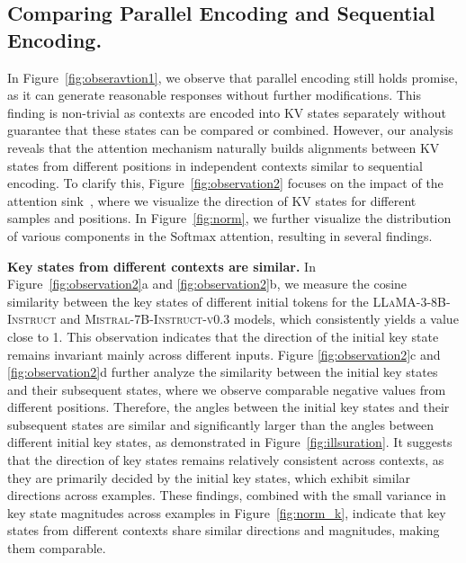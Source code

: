 \subsection{Comparing Parallel Encoding and Sequential Encoding.}
\label{obs1}
In Figure~\ref{fig:obseravtion1}, we observe that parallel encoding still holds promise, as it can generate reasonable responses without further modifications. This finding is non-trivial as contexts are encoded into KV states separately without guarantee that these states can be compared or combined. However, our analysis reveals that the attention mechanism naturally builds alignments between KV states from different positions in independent contexts similar to sequential encoding. To clarify this, Figure~\ref{fig:observation2} focuses on the impact of the attention sink~\citep{xiao2023efficient}, where we visualize the direction of KV states for different samples and positions. In Figure~\ref{fig:norm}, we further visualize the distribution of various components in the $\mathrm{Softmax}$ attention, resulting in several findings.








\textbf{Key states from different contexts are similar.}  
In Figure~\ref{fig:observation2}a and \ref{fig:observation2}b, we measure the cosine similarity between the key states of different initial tokens for the \textsc{LLaMA-3-8B-Instruct} and \textsc{Mistral-7B-Instruct-v0.3} models, which consistently yields a value close to 1. This observation indicates that the direction of the initial key state remains invariant mainly across different inputs. Figure \ref{fig:observation2}c and \ref{fig:observation2}d further analyze the similarity between the initial key states and their subsequent states, where we observe comparable negative values from different positions. Therefore, the angles between the initial key states and their subsequent states are similar and significantly larger than the angles between different initial key states, as demonstrated in Figure~\ref{fig:illsuration}. It suggests that the direction of key states remains relatively consistent across contexts, as they are primarily decided by the initial key states, which exhibit similar directions across examples. These findings, combined with the small variance in key state magnitudes across examples in Figure~\ref{fig:norm_k}, indicate that key states from different contexts share similar directions and magnitudes, making them comparable. 
 
